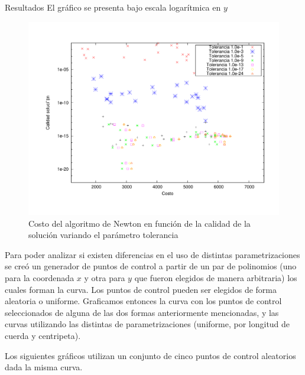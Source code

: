 \begin{section}{Resultados}
	El gráfico se presenta bajo escala logarítmica en $y$\\

	\begin{figure}[H]
	  \centering
		\includegraphics[width=14cm]{graficos/tol_graf.pdf}
	  \caption{Costo del algoritmo de Newton en función de la calidad de la solución variando el parámetro tolerancia}
	  \label{fig:5p_r}
	\end{figure}
	
	\VSP
	
	Para poder analizar si existen diferencias en el uso de distintas parametrizaciones se creó un generador de puntos de control a partir de un par de polinomios (uno para la coordenada $x$ y otra para $y$ que fueron elegidos de manera arbitraria) los cuales forman la curva. Los puntos de control pueden ser elegidos de forma aleatoria o uniforme. Graficamos entonces la curva con los puntos de control seleccionados de alguna de las dos formas anteriormente mencionadas, y las curvas utilizando las distintas de parametrizaciones (uniforme, por longitud de cuerda y centripeta).
	
	Los siguientes gráficos utilizan un conjunto de cinco puntos de control aleatorios dada la misma curva.
		

\end{section}

